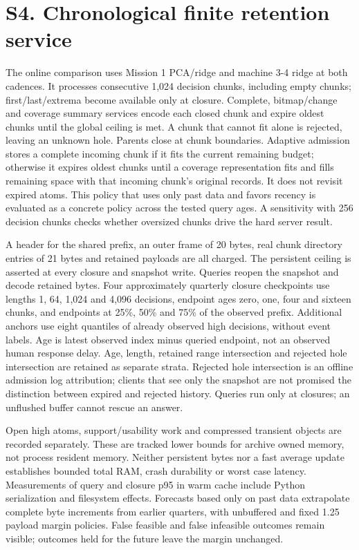 \documentclass[11pt]{article}
\begin{document}
\section*{S4. Chronological finite retention service}
The online comparison uses Mission 1 PCA/ridge and machine 3-4 ridge at both cadences. It processes consecutive 1,024 decision chunks, including empty chunks; first/last/extrema become available only at closure. Complete, bitmap/change and coverage summary services encode each closed chunk and expire oldest chunks until the global ceiling is met. A chunk that cannot fit alone is rejected, leaving an unknown hole. Parents close at chunk boundaries. Adaptive admission stores a complete incoming chunk if it fits the current remaining budget; otherwise it expires oldest chunks until a coverage representation fits and fills remaining space with that incoming chunk’s original records. It does not revisit expired atoms. This policy that uses only past data and favors recency is evaluated as a concrete policy across the tested query ages. A sensitivity with 256 decision chunks checks whether oversized chunks drive the hard server result.

A header for the shared prefix, an outer frame of 20 bytes, real chunk directory entries of 21 bytes and retained payloads are all charged. The persistent ceiling is asserted at every closure and snapshot write. Queries reopen the snapshot and decode retained bytes. Four approximately quarterly closure checkpoints use lengths 1, 64, 1,024 and 4,096 decisions, endpoint ages zero, one, four and sixteen chunks, and endpoints at 25\%, 50\% and 75\% of the observed prefix. Additional anchors use eight quantiles of already observed high decisions, without event labels. Age is latest observed index minus queried endpoint, not an observed human response delay. Age, length, retained range intersection and rejected hole intersection are retained as separate strata. Rejected hole intersection is an offline admission log attribution; clients that see only the snapshot are not promised the distinction between expired and rejected history. Queries run only at closures; an unflushed buffer cannot rescue an answer.

Open high atoms, support/usability work and compressed transient objects are recorded separately. These are tracked lower bounds for archive owned memory, not process resident memory. Neither persistent bytes nor a fast average update establishes bounded total RAM, crash durability or worst case latency. Measurements of query and closure p95 in warm cache include Python serialization and filesystem effects. Forecasts based only on past data extrapolate complete byte increments from earlier quarters, with unbuffered and fixed 1.25 payload margin policies. False feasible and false infeasible outcomes remain visible; outcomes held for the future leave the margin unchanged.
\end{document}
